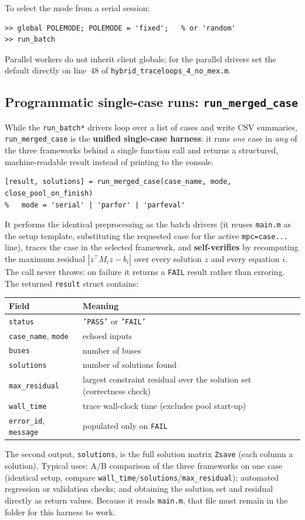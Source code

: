 \documentclass[11pt,a4paper]{article}
\newcommand{\code}[1]{\texttt{#1}}
\begin{document}
To select the mode from a serial session:
\begin{lstlisting}[style=mat]
>> global POLEMODE; POLEMODE = 'fixed';   % or 'random'
>> run_batch
\end{lstlisting}
Parallel workers do not inherit client globals; for the parallel drivers set the default
directly on line~48 of \code{hybrid_traceloops_4_no_mex.m}.

\subsection{Programmatic single-case runs: \code{run_merged_case}}
While the \code{run_batch*} drivers loop over a list of cases and write CSV summaries,
\code{run_merged_case} is the \textbf{unified single-case harness}: it runs \emph{one}
case in \emph{any} of the three frameworks behind a single function call and returns a
structured, machine-readable result instead of printing to the console.
\begin{lstlisting}[style=mat]
[result, solutions] = run_merged_case(case_name, mode, close_pool_on_finish)
%   mode = 'serial' | 'parfor' | 'parfeval'
\end{lstlisting}
It performs the identical preprocessing as the batch drivers (it reuses \code{main.m} as
the setup template, substituting the requested case for the active \code{mpc=case...}
line), traces the case in the selected framework, and \textbf{self-verifies} by
recomputing the maximum residual $|z^\top M_i z - b_i|$ over every solution $z$ and every
equation $i$. The call never throws: on failure it returns a \code{FAIL} result rather
than erroring. The returned \code{result} struct contains:

\begin{center}\small
\begin{tabular}{@{}ll@{}}
\toprule
Field & Meaning\\
\midrule
\code{status} & \code{'PASS'} or \code{'FAIL'}\\
\code{case_name}, \code{mode} & echoed inputs\\
\code{buses} & number of buses\\
\code{solutions} & number of solutions found\\
\code{max_residual} & largest constraint residual over the solution set (correctness check)\\
\code{wall_time} & trace wall-clock time (excludes pool start-up)\\
\code{error_id}, \code{message} & populated only on \code{FAIL}\\
\bottomrule
\end{tabular}
\end{center}
The second output, \code{solutions}, is the full solution matrix \code{Zsave} (each column
a solution). Typical uses: A/B comparison of the three frameworks on one case (identical
setup, compare \code{wall_time}/\code{solutions}/\code{max_residual}); automated
regression or validation checks; and obtaining the solution set and residual directly as
return values. Because it reads \code{main.m}, that file must remain in the folder for
this harness to work.
\end{document}
